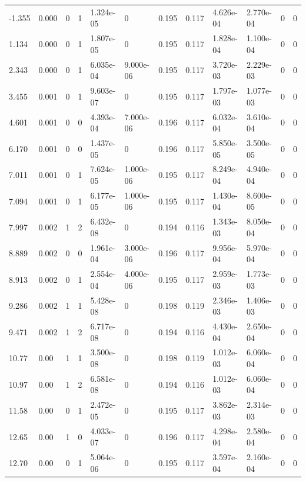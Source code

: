 \documentclass[preview]{standalone}
\begin{document}
{{\begin{tabular}{L{1.2cm}C{1.2cm} C{0.3cm}C{0.5cm} C{1.4cm}C{1.4cm} C{1.4cm}C{1.4cm} C{1.6cm}C{1.6cm} C{1.6cm}C{1.6cm}}
  -1.355  &  0.000  & 0     &  1 &  1.324e-05  & 0  &  0.195&   0.117& 4.626e-04 & 2.770e-04   &  0 & 0  \\ 
  1.134  &  0.000  & 0     &  1 &  1.807e-05  & 0  &  0.195&   0.117& 1.828e-04 & 1.100e-04   &  0 & 0  \\ 
  2.343  &  0.000  & 0     &  1 &  6.035e-04  & 9.000e-06  &  0.195&   0.117& 3.720e-03 & 2.229e-03   &  0 & 0  \\ 
  3.455  &  0.001  & 0     &  1 &  9.603e-07  & 0  &  0.195&   0.117& 1.797e-03 & 1.077e-03   &  0 & 0  \\ 
  4.601  &  0.001  & 0     &  0 &  4.393e-04  & 7.000e-06  &  0.196&   0.117& 6.032e-04 & 3.610e-04   &  0 & 0  \\ 
  6.170  &  0.001  & 0     &  0 &  1.437e-05  & 0  &  0.196&   0.117& 5.850e-05 & 3.500e-05   &  0 & 0  \\ 
  7.011  &  0.001  & 0     &  1 &  7.624e-05  & 1.000e-06  &  0.195&   0.117& 8.249e-04 & 4.940e-04   &  0 & 0  \\ 
  7.094  &  0.001  & 0     &  1 &  6.177e-05  & 1.000e-06  &  0.195&   0.117& 1.430e-04 & 8.600e-05   &  0 & 0  \\ 
  7.997  &  0.002  & 1     &  2 &  6.432e-08  & 0  &  0.194&   0.116& 1.343e-03 & 8.050e-04   &  0 & 0  \\ 
  8.889  &  0.002  & 0     &  0 &  1.961e-04  & 3.000e-06  &  0.196&   0.117& 9.956e-04 & 5.970e-04   &  0 & 0  \\ 
  8.913  &  0.002  & 0     &  1 &  2.554e-04  & 4.000e-06  &  0.195&   0.117& 2.959e-03 & 1.773e-03   &  0 & 0  \\ 
  9.286  &  0.002  & 1     &  1 &  5.428e-08  & 0  &  0.198&   0.119& 2.346e-03 & 1.406e-03   &  0 & 0  \\ 
  9.471  &  0.002  & 1     &  2 &  6.717e-08  & 0  &  0.194&   0.116& 4.430e-04 & 2.650e-04   &  0 & 0  \\ 
  10.77  &  0.00  & 1     &  1 &  3.500e-08  & 0  &  0.198&   0.119& 1.012e-03 & 6.060e-04   &  0 & 0  \\ 
  10.97  &  0.00  & 1     &  2 &  6.581e-08  & 0  &  0.194&   0.116& 1.012e-03 & 6.060e-04   &  0 & 0  \\ 
  11.58  &  0.00  & 0     &  1 &  2.472e-05  & 0  &  0.195&   0.117& 3.862e-03 & 2.314e-03   &  0 & 0  \\ 
  12.65  &  0.00  & 1     &  0 &  4.033e-07  & 0  &  0.196&   0.117& 4.298e-04 & 2.580e-04   &  0 & 0  \\ 
  12.70  &  0.00  & 0     &  1 &  5.064e-06  & 0  &  0.195&   0.117& 3.597e-04 & 2.160e-04   &  0 & 0  \\ 

\end{tabular}}}
\end{document}

